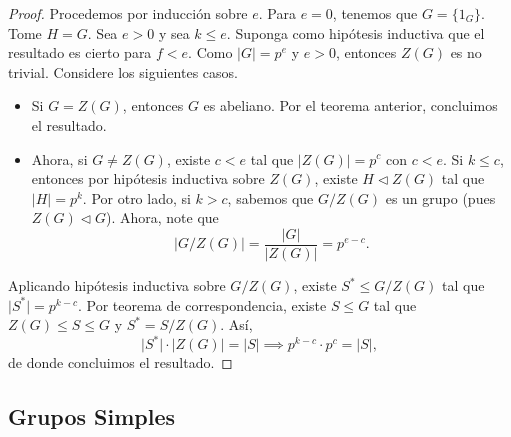 \documentclass[11pt,twoside]{article}
\newcounter{result}[subsection]
\begin{document}
\begin{proof}
Procedemos por inducción sobre $e$. Para $e=0$, tenemos que $G=\{ 1_{G} \}.$ Tome $H = G$. Sea $e > 0$ y sea $k \leq e$.  Suponga como hipótesis inductiva que el resultado es cierto para $f<e$. Como $\lvert G \rvert = p^{e}$ y $e>0$, entonces $Z(G)$ es no trivial. Considere los siguientes casos.
\begin{itemize}
\item Si $G = Z(G)$, entonces $G$ es abeliano. Por el teorema anterior, concluimos el resultado.
\item Ahora, si $G \neq Z(G)$, existe $c < e$ tal que $\lvert Z(G) \rvert = p^{c}$ con $c<e$. Si $k \leq c$, entonces por hipótesis inductiva sobre $Z(G)$, existe $H \triangleleft Z(G)$ tal que $\lvert H \rvert=p^{k}$. Por otro lado, si $k>c$, sabemos que $G / Z(G)$ es un grupo (pues $Z(G) \triangleleft G$). Ahora, note que
\[
\lvert G / Z(G) \rvert = \frac{\lvert G \rvert }{\lvert Z(G) \rvert } = p^{e-c}.
\]
\end{itemize}
Aplicando hipótesis inductiva sobre $G / Z(G)$, existe $S^{\ast} \leq G/Z(G)$ tal que $\lvert S^{\ast} \rvert = p^{k-c}$. Por teorema de correspondencia, existe $S \leq G$ tal que $Z(G) \leq S \leq G$ y $S^{\ast} = S / Z(G)$. Así,
\[
\lvert S^{\ast} \rvert \cdot \lvert Z(G) \rvert = \lvert S \rvert \implies p^{k-c} \cdot p^{c} = \lvert S \rvert,
\]
de donde concluimos el resultado.

\end{proof}

\subsection{Grupos Simples}
\end{document}

